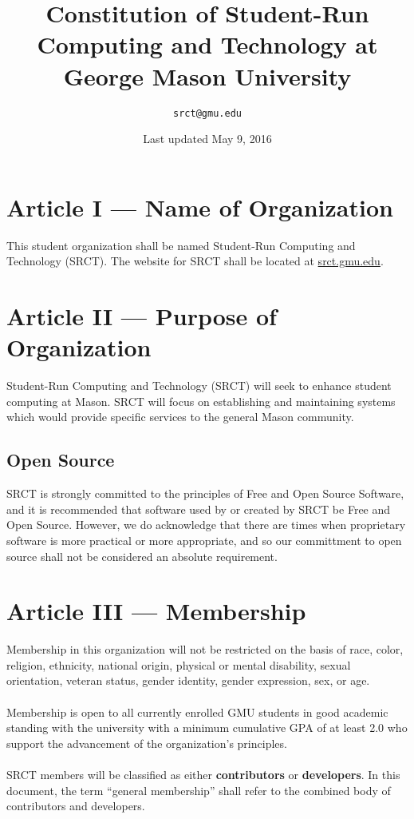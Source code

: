 \documentclass{article}
\title{\bfseries Constitution of Student-Run Computing and Technology at 
George Mason University}
\date{Last updated May 9, 2016}
\author{\texttt{srct@gmu.edu}}
\begin{document}
  
  \maketitle
  
  \section{Article I --- Name of Organization}
  This student organization shall be named Student-Run Computing and 
  Technology (SRCT). The website for SRCT shall be located at 
  \url{srct.gmu.edu}.
  
  \section{Article II --- Purpose of Organization}
  Student-Run Computing and Technology (SRCT) will seek to enhance 
  student computing at Mason. SRCT will focus on establishing and 
  maintaining systems which would provide specific services to the 
  general Mason community.
  
  \subsection{Open Source}
  SRCT is strongly committed to the principles of Free and Open Source
  Software, and it is recommended that software used by or created by SRCT be
  Free and Open Source. However, we do acknowledge that there are times when
  proprietary software is more practical or more appropriate, and so our
  committment to open source shall not be considered an absolute requirement.
  
  \section{Article III --- Membership}
  Membership in this organization will not be restricted on the basis of 
  race, color, religion, ethnicity, national origin, physical or mental 
  disability, sexual orientation, veteran status, gender identity, gender 
  expression, sex, or age. 
  \\ \\
  Membership is open to all currently enrolled GMU students in good 
  academic standing with the university with a minimum cumulative GPA of 
  at least 2.0 who support the advancement of the organization's 
  principles.
  \\ \\
  SRCT members will be classified as either \textbf{contributors} or 
  \textbf{developers}. In this document, the term ``general membership''
  shall refer to the combined body of contributors and developers.
  
\end{document}
